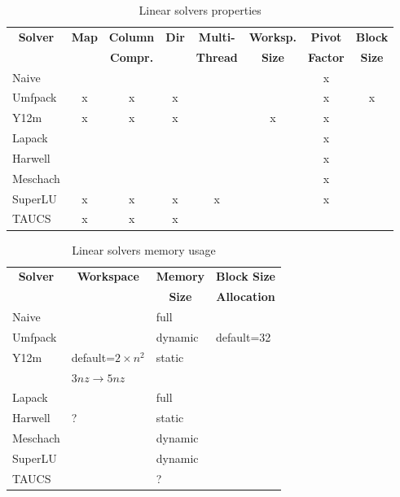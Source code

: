 \begin{table}
\centering
\caption{Linear solvers properties}\label{tab:solvers-props}
\begin{tabular}{lccccccc}
\hline\hline
	\multicolumn{1}{c}{\textbf{Solver}} &
	\multicolumn{1}{c}{\textbf{Map}} &
	\multicolumn{1}{c}{\textbf{Column}} &
	\multicolumn{1}{c}{\textbf{Dir}} &
	\multicolumn{1}{c}{\textbf{Multi-}} &
	\multicolumn{1}{c}{\textbf{Worksp.}} &
	\multicolumn{1}{c}{\textbf{Pivot}} &
	\multicolumn{1}{c}{\textbf{Block}} \\
	& & \multicolumn{1}{c}{\textbf{Compr.}} &
	& \multicolumn{1}{c}{\textbf{Thread}}
	& \multicolumn{1}{c}{\textbf{Size}}
	& \multicolumn{1}{c}{\textbf{Factor}}
	& \multicolumn{1}{c}{\textbf{Size}} \\
\hline
	Naive		& 	&	&	&	&	& x	&	\\
	Umfpack		& x	& x	& x	&	&	& x	& x	\\
	Y12m		& x	& x	& x	&	& x	& x	&	\\
	Lapack		&	&	&	&	&	& x	&	\\
	Harwell		&	&	&	&	&	& x	&	\\
	Meschach	&	&	&	&	&	& x	&	\\
	SuperLU		& x	& x	& x	& x	&	& x	&	\\
	TAUCS		& x	& x	& x	&	&	&	&	\\
\hline\hline
\end{tabular}
\end{table}

\noindent

\begin{table}
\centering
\caption{Linear solvers memory usage}\label{tab:solvers-memory}
\begin{tabular}{llll}
\hline\hline
	\multicolumn{1}{c}{\textbf{Solver}} &
	\multicolumn{1}{c}{\textbf{Workspace}} &
	\multicolumn{1}{c}{\textbf{Memory}} &
	\multicolumn{1}{c}{\textbf{Block Size}} \\
	&
	&
	\multicolumn{1}{c}{\textbf{Size}} &
	\multicolumn{1}{c}{\textbf{Allocation}} \\
\hline
	Naive		& 			& full		&		\\
	Umfpack 	& 			& dynamic	& default=32	\\
	Y12m 		& default=$2\times{n^2}$& static	&		\\
			& $3nz \rightarrow 5nz$	&		&		\\
	Lapack		&			& full		&		\\
	Harwell		& ?			& static	&		\\
	Meschach	& 			& dynamic	&		\\
	SuperLU		& 			& dynamic 	&		\\
	TAUCS		&			& ?		&		\\
\hline\hline
\end{tabular}
\end{table}

